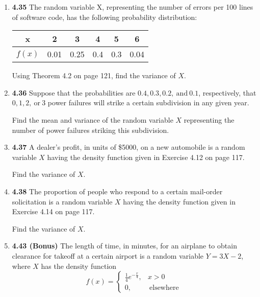 \documentclass[basic, header]{nosvagor-notes}
\begin{document}
\begin{enumerate}[leftmargin=1.5em, itemsep=4em]

  \item \textbf{4.35} The random variable X, representing the number of
    errors per 100 lines of software code, has the following probability
    distribution:

    \begin{table}[h]
      \centering
      \begin{tabular}{c|ccccc}
        x &  2 & 3 & 4  & 5 & 6 \\
        \midrule
        \(f(x)\)  & 0.01 & 0.25 &0.4 & 0.3 & 0.04 \\
      \end{tabular}
    \end{table}

    Using Theorem 4.2 on page 121, find the variance of \(X\).

  \item \textbf{4.36} Suppose that the probabilities are \(0.4, 0.3, 0.2,
    ~\text{and}~ 0.1\), respectively, that \(0, 1, 2, ~\text{or}~ 3\) power
    failures will strike a certain subdivision in any given year.

    Find the mean and variance of the random variable \(X\) representing the
    number of power failures striking this subdivision.

  \item \textbf{4.37} A dealer’s profit, in units of \$5000, on a new
    automobile is a random variable \(X\) having the density function given in
    Exercise 4.12 on page 117.

    Find the variance of \(X\).

  \newpage %

  \item \textbf{4.38} The proportion of people who respond to a certain
    mail-order solicitation is a random variable \(X\) having the density
    function given in Exercise 4.14 on page 117.

    Find the variance of \(X\).

  \item \textbf{4.43 (Bonus)} The length of time, in minutes, for an airplane
    to obtain clearance for takeoff at a certain airport is a random variable
    \(Y = 3X - 2\), where \(X\) has the density function
    \[%
      f(x) =
      \begin{cases}
        \frac{1}{4}e^{-\frac{x}{4}}, & x > 0 \\
        0, & ~\text{elsewhere}~
      \end{cases}
    \]%


\end{enumerate}
\end{document}
